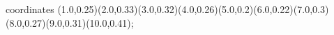 					coordinates { (1.0,0.25)(2.0,0.33)(3.0,0.32)(4.0,0.26)(5.0,0.2)(6.0,0.22)(7.0,0.3)(8.0,0.27)(9.0,0.31)(10.0,0.41)};